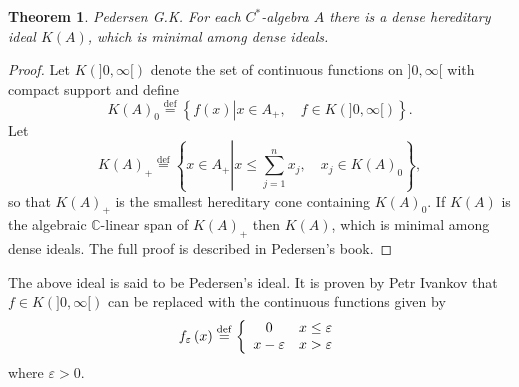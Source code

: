 \documentclass{beamer}
\theoremstyle{plain}
\newtheorem{thm}{Theorem}%
\newcommand{\be}{\begin{equation}}
\newcommand{\ee}{\end{equation}}
\newcommand{\C}{\mathbb{C}}
\newcommand{\eps}{\varepsilon}                    %
\newcommand{\bydef}{\stackrel{\mathrm{def}}{=}}
\begin{document}
\begin{frame}
	\begin{thm}\label{pedersen_ideal_thm} \alert{Pedersen G.K.}
		For each $C^*$-algebra $A$ there is a dense hereditary ideal $K(A)$,
		which is minimal among dense ideals.
		
	\end{thm}
	\begin{proof}
		Let $K(]0, \infty [)$ denote the set of continuous functions on $]0, \infty [$ with 
		compact support and define 
		\be\label{pedersen_k0_eqn}
		K\left( A \right)_0 \bydef \left\{f\left(x\right) \left|x \in A_+, \quad f \in K(]0, \infty [) \right.\right\}.
		\ee
		Let 
		\be\label{pedersen_k_plus_eqn}
		K\left( A \right)_+ \bydef \left\{x \in A_+ \left|x \le \sum_{j = 1}^nx_j, \quad x_j \in  	K\left( A \right)_0\right.\right\}, 	
		\ee
		so that $	K\left( A \right)_+$ is the smallest hereditary cone  containing $K\left( A \right)_0$. If $K(A)$ 
		is  the algebraic  $\C$-linear span of $K(A)_+$ then $K(A)$,
		which is minimal among dense ideals. The full  proof is  described in Pedersen's book.
	\end{proof}
	
\end{frame}

\begin{frame}
	The above ideal is said to be \alert{Pedersen's ideal}. It is  proven by \alert{Petr Ivankov} that $f \in K(]0, \infty [)$ can be replaced with the continuous functions given by
		$$
		f_\eps\left( x\right)  \bydef\left\{
		\begin{array}{c l}
			0 &x \le \eps \\
			x - \eps & x > \eps
		\end{array}\right.
	$$
	where $\eps > 0$.
\end{frame}
\end{document}
